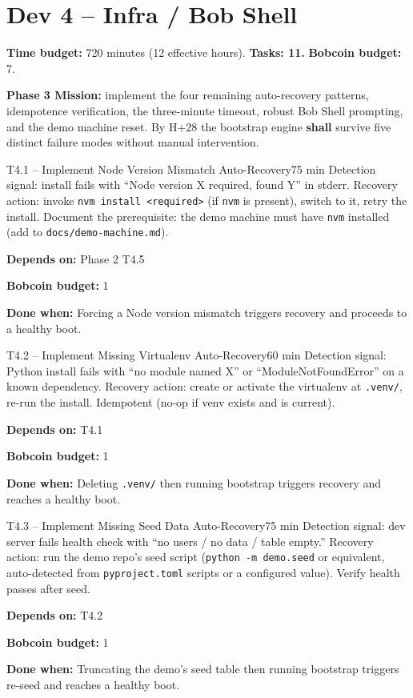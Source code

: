 \documentclass[11pt,letterpaper]{article}
\newcommand{\acceptance}[1]{\par\smallskip\textcolor{ibmgreen}{\textbf{Done when:}} #1}
\newcommand{\depends}[1]{\par\smallskip\textcolor{ibmorange}{\textbf{Depends on:}} #1}
\newcommand{\bobcost}[1]{\par\smallskip\textcolor{ibmaccent}{\textbf{Bobcoin budget:}} #1}
\newcommand{\shall}{\textbf{shall}}
\begin{document}
\section{Dev 4 -- Infra / Bob Shell}

\textbf{Time budget:} 720 minutes (12 effective hours). \textbf{Tasks: 11.} \textbf{Bobcoin budget:} 7.

\textbf{Phase 3 Mission:} implement the four remaining auto-recovery patterns, idempotence verification, the three-minute timeout, robust Bob Shell prompting, and the demo machine reset. By H+28 the bootstrap engine \shall{} survive five distinct failure modes without manual intervention.

\begin{task}{T4.1 -- Implement Node Version Mismatch Auto-Recovery}{75 min}
Detection signal: install fails with ``Node version X required, found Y'' in stderr. Recovery action: invoke \texttt{nvm install <required>} (if \texttt{nvm} is present), switch to it, retry the install. Document the prerequisite: the demo machine must have \texttt{nvm} installed (add to \texttt{docs/demo-machine.md}).
\depends{Phase 2 T4.5}
\bobcost{1}
\acceptance{Forcing a Node version mismatch triggers recovery and proceeds to a healthy boot.}
\end{task}

\begin{task}{T4.2 -- Implement Missing Virtualenv Auto-Recovery}{60 min}
Detection signal: Python install fails with ``no module named X'' or ``ModuleNotFoundError'' on a known dependency. Recovery action: create or activate the virtualenv at \texttt{.venv/}, re-run the install. Idempotent (no-op if venv exists and is current).
\depends{T4.1}
\bobcost{1}
\acceptance{Deleting \texttt{.venv/} then running bootstrap triggers recovery and reaches a healthy boot.}
\end{task}

\begin{task}{T4.3 -- Implement Missing Seed Data Auto-Recovery}{75 min}
Detection signal: dev server fails health check with ``no users / no data / table empty.'' Recovery action: run the demo repo's seed script (\texttt{python -m demo.seed} or equivalent, auto-detected from \texttt{pyproject.toml} scripts or a configured value). Verify health passes after seed.
\depends{T4.2}
\bobcost{1}
\acceptance{Truncating the demo's seed table then running bootstrap triggers re-seed and reaches a healthy boot.}
\end{task}
\end{document}

